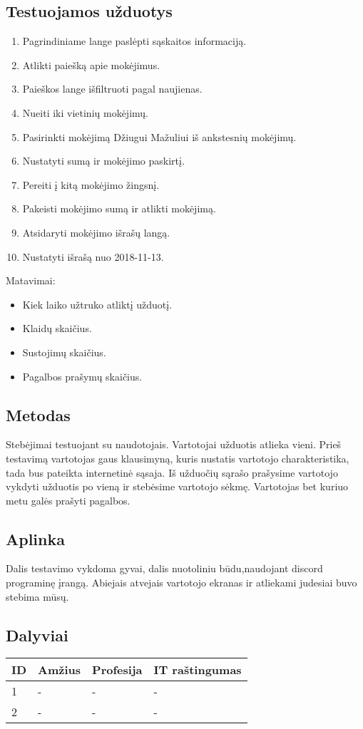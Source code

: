 \documentclass[oneside]{VUMIFPSkursinis}
\begin{document}
\subsection{Testuojamos užduotys}
\begin{enumerate}
	\item Pagrindiniame lange paslėpti sąskaitos informaciją.
	\item Atlikti paiešką apie mokėjimus.
	\item Paieškos lange išfiltruoti pagal naujienas.
	\item Nueiti iki vietinių mokėjimų.
	\item Pasirinkti mokėjimą Džiugui Mažuliui iš ankstesnių mokėjimų.
	\item Nustatyti sumą ir mokėjimo paskirtį.
	\item Pereiti į kitą mokėjimo žingsnį.
	\item Pakeisti mokėjimo sumą ir atlikti mokėjimą.
	\item Atsidaryti mokėjimo išrašų langą.
	\item Nustatyti išrašą nuo 2018-11-13.
\end{enumerate}
Matavimai:
\begin{itemize}
	\item Kiek laiko užtruko atliktį užduotį.
	\item Klaidų skaičius.
	\item Sustojimų skaičius.
	\item Pagalbos prašymų skaičius.
\end{itemize}
\subsection{Metodas}
Stebėjimai testuojant su naudotojais. Vartotojai užduotis atlieka vieni. Prieš testavimą vartotojas gaus klausimyną, kuris nustatis vartotojo charakteristika, tada bus pateikta internetinė sąsaja. Iš užduočių sąrašo prašysime vartotojo vykdyti užduotis po vieną ir stebėsime vartotojo sėkmę. Vartotojas bet kuriuo metu galės prašyti pagalbos. 
\subsection{Aplinka}
Dalis testavimo vykdoma gyvai, dalis nuotoliniu būdu,naudojant discord programinę įrangą. Abiejais atvejais vartotojo ekranas ir atliekami judesiai buvo stebima mūsų.
\subsection{Dalyviai}
\begin{center}
	\begin{tabular}{ |p{1cm} | p{2cm} | p{4cm} | p{4cm} |}
	\hline
ID&Amžius&Profesija&IT raštingumas \\ \hline
1&-&-&- \\ \hline
2&-&-&- \\ \hline
\end{tabular}
\end{center}
\end{document}
